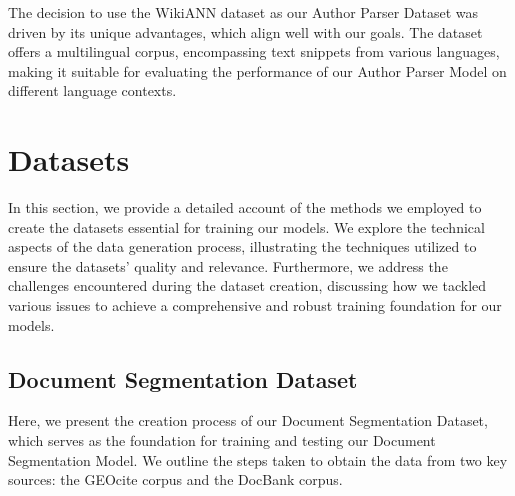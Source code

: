 The decision to use the WikiANN dataset as our Author Parser Dataset was driven by its unique advantages, which align well with our goals. The dataset offers a multilingual corpus, encompassing text snippets from various languages, making it suitable for evaluating the performance of our Author Parser Model on different language contexts.

\section{Datasets}\label{sec:methods_datasets}
In this section, we provide a detailed account of the methods we employed to create the datasets essential for training our models. We explore the technical aspects of the data generation process, illustrating the techniques utilized to ensure the datasets' quality and relevance. Furthermore, we address the challenges encountered during the dataset creation, discussing how we tackled various issues to achieve a comprehensive and robust training foundation for our models.

\subsection{Document Segmentation Dataset}\label{sec:document_segmentation_dataset}
Here, we present the creation process of our Document Segmentation Dataset, which serves as the foundation for training and testing our Document Segmentation Model. We outline the steps taken to obtain the data from two key sources: the GEOcite corpus and the DocBank corpus.

